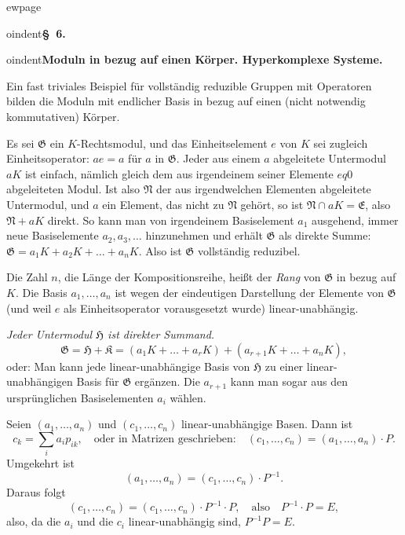 \documentclass[12pt,a4paper]{article}
\theoremstyle{definition}
\begin{document}
ewpage
\setcounter{page}{590}



oindent\textbf{\S~6.}



oindent\textbf{Moduln in bezug auf einen K\"orper. Hyperkomplexe Systeme.}

Ein fast triviales Beispiel f\"ur vollst\"andig reduzible Gruppen mit
Operatoren bilden die Moduln mit endlicher Basis in bezug auf einen
(nicht notwendig kommutativen) K\"orper.

Es sei $\mathfrak{G}$ ein $K$-Rechtsmodul, und das Einheitselement $e$
von $K$ sei zugleich Einheitsoperator: $ae = a$ f\"ur $a$ in
$\mathfrak{G}$. Jeder aus einem $a$ abgeleitete Untermodul $aK$ ist
einfach, n\"amlich gleich dem aus irgendeinem seiner Elemente $ eq 0$
abgeleiteten Modul. Ist also $\mathfrak{N}$ der aus irgendwelchen
Elementen abgeleitete Untermodul, und $a$ ein Element, das nicht zu
$\mathfrak{N}$ geh\"ort, so ist $\mathfrak{N} \cap aK =
\mathfrak{E}$, also $\mathfrak{N} + aK$ direkt. So kann man von
irgendeinem Basiselement $a_1$ ausgehend, immer neue Basiselemente
$a_2, a_3, \dots$ hinzunehmen und erh\"alt $\mathfrak{G}$ als direkte
Summe: $\mathfrak{G} = a_1 K + a_2 K + \dots + a_n K$. Also ist
$\mathfrak{G}$ vollst\"andig reduzibel.

Die Zahl $n$, die L\"ange der Kompositionsreihe, hei\ss t der
\textit{Rang} von $\mathfrak{G}$ in bezug auf $K$. Die Basis
$a_1, \dots, a_n$ ist wegen der eindeutigen Darstellung der Elemente von
$\mathfrak{G}$ (und weil $e$ als Einheitsoperator vorausgesetzt wurde)
linear-unabh\"angig.

\textit{Jeder Untermodul $\mathfrak{H}$ ist direkter Summand.}
\[
\mathfrak{G} = \mathfrak{H} + \mathfrak{K}
= (a_1 K + \dots + a_r K) + (a_{r+1} K + \dots + a_n K),
\]
oder: Man kann jede linear-unabh\"angige Basis von $\mathfrak{H}$ zu
einer linear-unabh\"angigen Basis f\"ur $\mathfrak{G}$ erg\"anzen. Die
$a_{r+1}$ kann man sogar aus den urspr\"unglichen Basiselementen $a_i$
w\"ahlen.

Seien $(a_1, \dots, a_n)$ und $(c_1, \dots, c_n)$ linear-unabh\"angige
Basen. Dann ist
\[
c_k = \sum_i a_i p_{ik}, \quad\text{oder in Matrizen geschrieben:}\quad
(c_1, \dots, c_n) = (a_1, \dots, a_n) \cdot P.
\]
Umgekehrt ist
\[
(a_1, \dots, a_n) = (c_1, \dots, c_n) \cdot P^{-1}.
\]
Daraus folgt
\[
(c_1, \dots, c_n) = (c_1, \dots, c_n) \cdot P^{-1} \cdot P,
\quad\text{also}\quad P^{-1} \cdot P = E,
\]
also, da die $a_i$ und die $c_i$ linear-unabh\"angig sind,
$P^{-1}P = E$.
\end{document}
